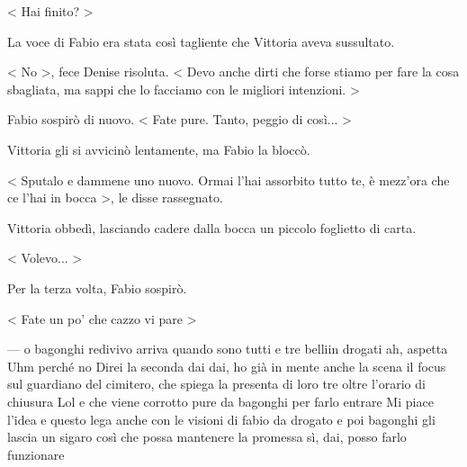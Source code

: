 < Hai finito? >

La voce di Fabio era stata così tagliente che Vittoria aveva sussultato.

< No >, fece Denise risoluta. < Devo anche dirti che forse stiamo per fare la cosa sbagliata, ma sappi che lo facciamo con le migliori intenzioni. >

Fabio sospirò di nuovo. < Fate pure. Tanto, peggio di così... >

Vittoria gli si avvicinò lentamente, ma Fabio la bloccò.

< Sputalo e dammene uno nuovo. Ormai l'hai assorbito tutto te, è mezz'ora che ce l'hai in bocca >, le disse rassegnato.

Vittoria obbedì, lasciando cadere dalla bocca un piccolo foglietto di carta.

< Volevo... >

Per la terza volta, Fabio sospirò.

< Fate un po' che cazzo vi pare >

---
o bagonghi redivivo arriva quando sono tutti e tre belliin drogati
ah, aspetta
Uhm
perché no
Direi la seconda
dai dai, ho già in mente anche la scena
il focus sul guardiano del cimitero, che spiega la presenta di loro tre oltre l'orario di chiusura
Lol
e che viene corrotto pure da bagonghi per farlo entrare
Mi piace l'idea
e questo lega anche con le visioni di fabio da drogato
e poi bagonghi gli lascia un sigaro
così che possa mantenere la promessa
sì, dai, posso farlo funzionare
